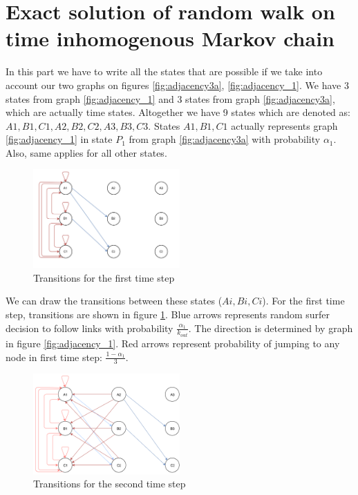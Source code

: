 \documentclass{article}
\begin{document}
\section{Exact solution of random walk on time inhomogenous Markov chain}

In this part we have to write all the states that are possible if we take into account our two graphs on figures \ref{fig:adjacency3a}, \ref{fig:adjacency_1}. We have 3 states from graph \ref{fig:adjacency_1} and 3 states from graph \ref{fig:adjacency3a}, which are actually time states. Altogether we have 9 states which are denoted as: $A1, B1, C1, A2, B2, C2, A3, B3, C3$. States $A1, B1, C1$ actually represents graph \ref{fig:adjacency_1} in state $P_1$ from graph \ref{fig:adjacency3a} with probability $\alpha_1$. Also, same applies for all other states.

\begin{figure}
\centering
\includegraphics[width=0.5\textwidth]{tihMC_1_step}
\caption{Transitions for the first time step}
\label{fig:tihMC_1_step}
\end{figure}

We can draw the transitions between these states ($Ai, Bi, Ci$). For the first time step, transitions are shown in figure \ref{fig:tihMC_1_step}. Blue arrows represents random surfer decision to follow links with probability $\frac{\alpha_1}{k_{out}}$. The direction is determined by graph in figure \ref{fig:adjacency_1}. Red arrows represent probability of jumping to any node in first time step: $\frac{1-\alpha_1}{3}$.


\begin{figure}
\centering
\includegraphics[width=0.5\textwidth]{tihMC_2_step}
\caption{Transitions for the second time step}
\label{fig:tihMC_2_step}
\end{figure}
\end{document}
